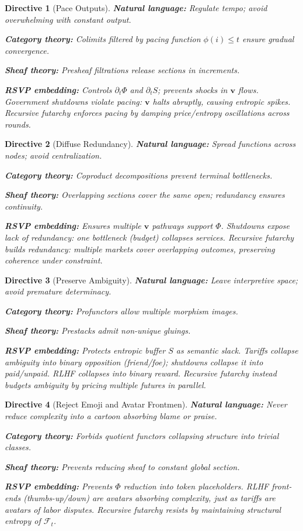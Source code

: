\documentclass{article}
\newtheorem{directive}{Directive}
\begin{document}
\begin{directive}[Pace Outputs]
\textbf{Natural language:} Regulate tempo; avoid overwhelming with constant output.  

\textbf{Category theory:} Colimits filtered by pacing function $\phi(i)\leq t$ ensure gradual convergence.  

\textbf{Sheaf theory:} Presheaf filtrations release sections in increments.  

\textbf{RSVP embedding:} Controls $\partial_t \Phi$ and $\partial_t S$; prevents shocks in $\mathbf{v}$ flows.  
Government shutdowns violate pacing: $\mathbf{v}$ halts abruptly, causing entropic spikes.  
Recursive futarchy enforces pacing by damping price/entropy oscillations across rounds.
\end{directive}

\begin{directive}[Diffuse Redundancy]
\textbf{Natural language:} Spread functions across nodes; avoid centralization.  

\textbf{Category theory:} Coproduct decompositions prevent terminal bottlenecks.  

\textbf{Sheaf theory:} Overlapping sections cover the same open; redundancy ensures continuity.  

\textbf{RSVP embedding:} Ensures multiple $\mathbf{v}$ pathways support $\Phi$.  
Shutdowns expose lack of redundancy: one bottleneck (budget) collapses services.  
Recursive futarchy builds redundancy: multiple markets cover overlapping outcomes, preserving coherence under constraint.
\end{directive}

\begin{directive}[Preserve Ambiguity]
\textbf{Natural language:} Leave interpretive space; avoid premature determinacy.  

\textbf{Category theory:} Profunctors allow multiple morphism images.  

\textbf{Sheaf theory:} Prestacks admit non-unique gluings.  

\textbf{RSVP embedding:} Protects entropic buffer $S$ as semantic slack.  
Tariffs collapse ambiguity into binary opposition (friend/foe); shutdowns collapse it into paid/unpaid.  
RLHF collapses into binary reward. Recursive futarchy instead budgets ambiguity by pricing multiple futures in parallel.
\end{directive}

\begin{directive}[Reject Emoji and Avatar Frontmen]
\textbf{Natural language:} Never reduce complexity into a cartoon absorbing blame or praise.  

\textbf{Category theory:} Forbids quotient functors collapsing structure into trivial classes.  

\textbf{Sheaf theory:} Prevents reducing sheaf to constant global section.  

\textbf{RSVP embedding:} Prevents $\Phi$ reduction into token placeholders.  
RLHF front-ends (thumbs-up/down) are avatars absorbing complexity, just as tariffs are avatars of labor disputes.  
Recursive futarchy resists by maintaining structural entropy of $\mathcal{F}_t$.
\end{directive}
\end{document}
